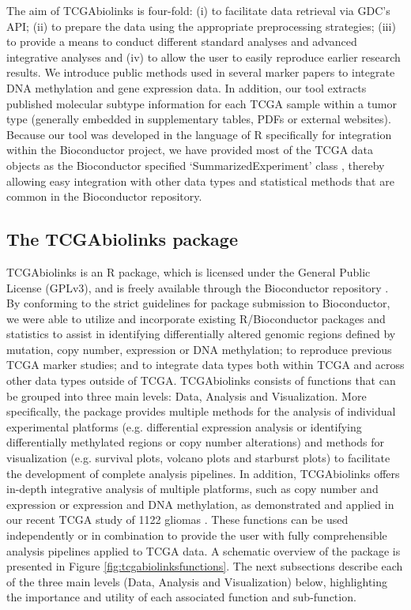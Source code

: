 The aim of TCGAbiolinks is four-fold: (i) to facilitate
data retrieval via GDC’s API; (ii) to prepare the data
using the appropriate preprocessing strategies; (iii) to provide
a means to conduct different standard analyses and
advanced integrative analyses and (iv) to allow the user to 
easily reproduce earlier research results. 
We introduce public methods
used in several marker papers to integrate DNA methylation
and gene expression data. In addition, our tool extracts
published molecular subtype information for each
TCGA sample within a tumor type (generally embedded in
supplementary tables, PDFs or external websites). Because
our tool was developed in the language of R specifically for integration within the Bioconductor project, we have provided most of the TCGA data objects as the Bioconductor specified
‘SummarizedExperiment’ class \cite{huber2015orchestrating}, thereby allowing easy integration with other data types and statistical
methods that are common in the Bioconductor repository.





\subsection{The TCGAbiolinks package}
TCGAbiolinks is an R package, which is licensed under
the General Public License (GPLv3), and is freely available
through the Bioconductor repository \cite{gentleman2004bioconductor}. By conforming to the strict guidelines for package submission to
Bioconductor, we were able to utilize and incorporate existing R/Bioconductor packages and statistics to assist in identifying differentially altered genomic regions defined by mutation, copy number, expression or DNA methylation; to reproduce previous TCGA marker studies; and to integrate data types both within TCGA and across other data types outside of TCGA. TCGAbiolinks consists of functions that can be grouped into three main levels: Data, Analysis and Visualization. More specifically, the package provides multiple methods for the analysis of individual experimental platforms (e.g. differential expression analysis or identifying
differentially methylated regions or copy number alterations) and methods for visualization (e.g. survival plots, volcano plots and starburst plots) to facilitate the development of complete analysis pipelines. In addition, TCGAbiolinks
offers in-depth integrative analysis of multiple platforms,
such as copy number and expression or expression
and DNA methylation, as demonstrated and applied in our
recent TCGA study of 1122 gliomas \cite{ceccarelli2016molecular}. These functions
can be used independently or in combination to provide the
user with fully comprehensible analysis pipelines applied to
TCGA data. A schematic overview of the package is presented
in Figure \ref{fig:tcgabiolinksfunctions}. The next subsections describe each of the three main levels (Data, Analysis and Visualization) below, highlighting the importance and utility of each associated function and sub-function. 

